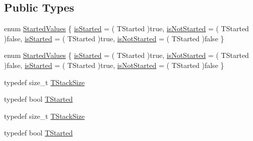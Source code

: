 \subsection*{Public Types}
\begin{DoxyCompactItemize}
\item 
enum \hyperlink{class_thread_base_a6676ad16581b715cf6d59180fd990cf1}{Started\-Values} \{ \hyperlink{class_thread_base_a6676ad16581b715cf6d59180fd990cf1a7f7568154f1d8cb41784eb6ab0bad8ab}{is\-Started} = ( T\-Started )true, 
\hyperlink{class_thread_base_a6676ad16581b715cf6d59180fd990cf1a5bc1ddd745f1071c077af32b57f587fb}{is\-Not\-Started} = ( T\-Started )false, 
\hyperlink{class_thread_base_a6676ad16581b715cf6d59180fd990cf1a7f7568154f1d8cb41784eb6ab0bad8ab}{is\-Started} = ( T\-Started )true, 
\hyperlink{class_thread_base_a6676ad16581b715cf6d59180fd990cf1a5bc1ddd745f1071c077af32b57f587fb}{is\-Not\-Started} = ( T\-Started )false
 \}
\item 
enum \hyperlink{class_thread_base_a6676ad16581b715cf6d59180fd990cf1}{Started\-Values} \{ \hyperlink{class_thread_base_a6676ad16581b715cf6d59180fd990cf1a7f7568154f1d8cb41784eb6ab0bad8ab}{is\-Started} = ( T\-Started )true, 
\hyperlink{class_thread_base_a6676ad16581b715cf6d59180fd990cf1a5bc1ddd745f1071c077af32b57f587fb}{is\-Not\-Started} = ( T\-Started )false, 
\hyperlink{class_thread_base_a6676ad16581b715cf6d59180fd990cf1a7f7568154f1d8cb41784eb6ab0bad8ab}{is\-Started} = ( T\-Started )true, 
\hyperlink{class_thread_base_a6676ad16581b715cf6d59180fd990cf1a5bc1ddd745f1071c077af32b57f587fb}{is\-Not\-Started} = ( T\-Started )false
 \}
\item 
typedef size\-\_\-t \hyperlink{class_thread_base_af45bd74387b409e15989f7eddbaf3718}{T\-Stack\-Size}
\item 
typedef bool \hyperlink{class_thread_base_ad8b410e3bc7320addea3c5b56ff6c985}{T\-Started}
\item 
typedef size\-\_\-t \hyperlink{class_thread_base_af45bd74387b409e15989f7eddbaf3718}{T\-Stack\-Size}
\item 
typedef bool \hyperlink{class_thread_base_ad8b410e3bc7320addea3c5b56ff6c985}{T\-Started}
\end{DoxyCompactItemize}
